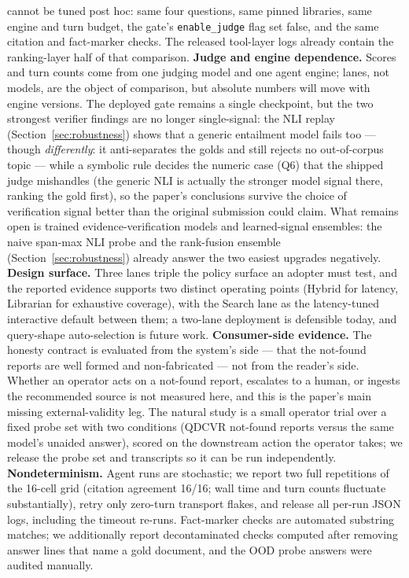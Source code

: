 \documentclass[preprint,12pt]{elsarticle}
\begin{document}
cannot be tuned post hoc: same four questions, same pinned libraries, same
engine and turn budget, the gate's \texttt{enable\_judge} flag set false, and
the same citation and fact-marker checks. The released tool-layer logs already
contain the ranking-layer half of that comparison.
\textbf{Judge and engine dependence.} Scores and turn counts come from one
judging model and one agent engine; lanes, not models, are the object of
comparison, but absolute numbers will move with engine versions. The
deployed gate remains a single checkpoint, but the two strongest
verifier findings are no longer single-signal: the NLI replay
(Section~\ref{sec:robustness}) shows that a generic entailment model
fails too --- though \emph{differently}: it anti-separates the golds and
still rejects no out-of-corpus topic --- while a symbolic rule decides
the numeric case (Q6) that the shipped judge mishandles (the generic NLI
is actually the stronger model signal there, ranking the gold first), so
the paper's conclusions survive the choice of verification
signal better than the original submission could claim. What remains
open is trained evidence-verification models and learned-signal
ensembles: the naive span-max NLI probe and the rank-fusion ensemble
(Section~\ref{sec:robustness}) already answer the two easiest upgrades
negatively.
\textbf{Design surface.} Three lanes triple the policy surface an adopter
must test, and the reported evidence supports two distinct operating
points (Hybrid for latency, Librarian for exhaustive coverage), with the
Search lane as the latency-tuned interactive default between them; a
two-lane deployment is defensible today, and query-shape auto-selection is
future work.
\textbf{Consumer-side evidence.} The honesty contract is evaluated from the
system's side --- that the not-found reports are well formed and
non-fabricated --- not from the reader's side. Whether an operator acts on a
not-found report, escalates to a human, or ingests the recommended source is
not measured here, and this is the paper's main missing external-validity leg.
The natural study is a small operator trial over a fixed probe set with two
conditions (QDCVR not-found reports versus the same model's unaided answer),
scored on the downstream action the operator takes; we release the probe set
and transcripts so it can be run independently.
\textbf{Nondeterminism.} Agent runs are stochastic; we report two full
repetitions of the 16-cell grid (citation agreement 16/16; wall time and
turn counts fluctuate substantially), retry only zero-turn transport
flakes, and release all per-run JSON logs, including the timeout re-runs.
Fact-marker checks are automated substring matches; we additionally report
decontaminated checks computed after removing answer lines that name a
gold document, and the OOD probe answers were audited manually.
\end{document}
